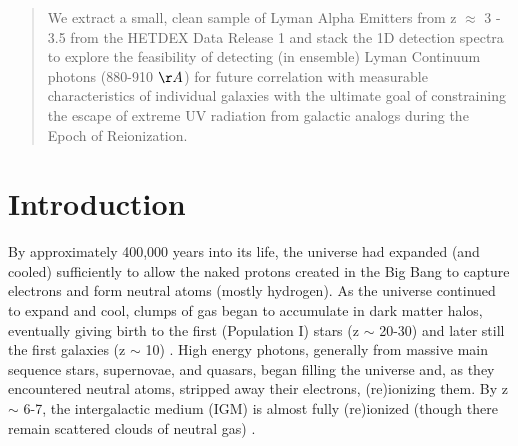 \documentclass{aastex62}
\begin{document}

\author[0000-0002-8925-9769]{Dustin Davis}


\begin{abstract}

We extract a small, clean sample of Lyman Alpha Emitters from z $\approx$ 3 - 3.5 from the HETDEX Data Release 1 and stack the 1D detection spectra to explore the feasibility of detecting (in ensemble) Lyman Continuum photons (880-910 $\AA$) for future correlation with measurable characteristics of individual galaxies with the ultimate goal of constraining the escape of extreme UV radiation from galactic analogs during the Epoch of Reionization.

\end{abstract}




\section{Introduction} \label{sec:intro}

By approximately 400,000 years into its life, the universe had expanded (and cooled) sufficiently to allow the naked protons created in the Big Bang to capture electrons and form neutral atoms (mostly hydrogen). As the universe continued to expand and cool, clumps of gas began to accumulate in dark matter halos, eventually giving birth to the first (Population I) stars (z $\sim$ 20-30) and later still the first galaxies (z $\sim$ 10) \cite{Bromm}. High energy photons, generally from massive main sequence stars, supernovae, and quasars, began filling the universe and, as they encountered neutral atoms, stripped away their electrons, (re)ionizing them. By z $\sim$ 6-7, the intergalactic medium (IGM) is almost fully (re)ionized (though there remain scattered clouds of neutral gas) \cite{Stark}.\\
\end{document}
